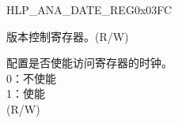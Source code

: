 \begin{register}{H}{LP\_ANA\_DATE\_REG}{0x03FC}\label{regdesc:LPANADATEREG}
%
%
\regnewline%
\begin{regdesc}\begin{reglist}
\label{fielddesc:LPANALPANADATE}\item [LP\_ANA\_LP\_ANA\_DATE] 版本控制寄存器。(R/W)
\label{fielddesc:LPANACLKEN}\item [LP\_ANA\_CLK\_EN] 配置是否使能访问寄存器的时钟。\\
0：不使能\\
1：使能\\
(R/W)
\end{reglist}\end{regdesc}
\end{register}
